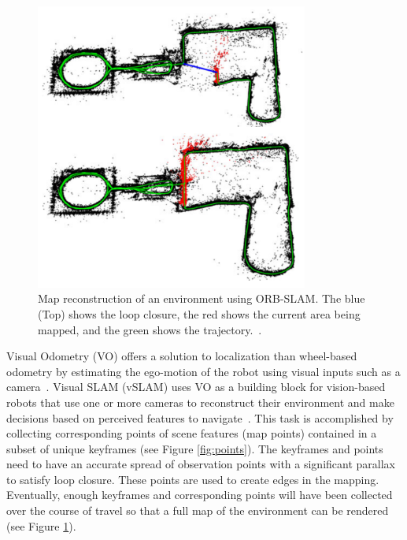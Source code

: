 \documentclass[12pt]{article}
\begin{document}
\begin{figure}[h!]
\centering
\includegraphics[width=0.8\textwidth]{slam.png}
\caption{Map reconstruction of an environment using ORB-SLAM. The blue (Top) shows the loop closure, the red shows the current area being mapped, and the green shows the trajectory.~\cite{mur2015orb}.}
\label{fig:slam}
\end{figure}

Visual Odometry (VO) offers a solution to localization than wheel-based odometry by estimating the ego-motion of the robot using visual inputs such as a camera~\cite{ciarfuglia2014evaluation, yousif2015overview}. Visual SLAM (vSLAM) uses VO as a building block for vision-based robots that use one or more cameras to reconstruct their environment and make decisions based on perceived features to navigate~\cite{gul2019comprehensive, mur2015orb}. This task is accomplished by collecting corresponding points of scene features (map points) contained in a subset of unique keyframes (see Figure \ref{fig:points}). The keyframes and points need to have an accurate spread of observation points with a significant parallax to satisfy loop closure. These points are used to create edges in the mapping. Eventually, enough keyframes and corresponding points will have been collected over the course of travel so that a full map of the environment can be rendered (see Figure \ref{fig:slam}).
\end{document}
